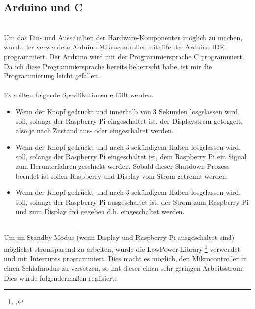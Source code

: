 \subsection{Arduino und C}\ \\
Um das Ein- und Ausschalten der Hardware-Komponenten möglich zu machen, wurde der verwendete Arduino Mikrocontroller mithilfe der Arduino IDE programmiert. Der Arduino wird mit der Programmiersprache C programmiert. Da ich diese Programmiersprache bereits beherrscht habe, ist mir die Programmierung leicht gefallen.\\
\\
Es sollten folgende Spezifikationen erfüllt werden:
\begin{itemize}
	\item Wenn der Knopf gedrückt und innerhalb von 3 Sekunden losgelassen wird, soll, solange der Raspberry Pi eingeschaltet ist, der Displaystrom getoggelt, also je nach Zustand aus- oder eingeschaltet werden.
	\item Wenn der Knopf gedrückt und nach 3-sekündigem Halten losgelassen wird, soll, solange der Raspberry Pi eingeschaltet ist, dem Raspberry Pi ein Signal zum Herunterfahren geschickt werden. Sobald dieser Shutdown-Prozess beendet ist sollen Raspberry und Display vom Strom getrennt werden.
	\item Wenn der Knopf gedrückt und nach 3-sekündigem Halten losgelassen wird, soll, solange der Raspberry Pi ausgeschaltet ist, der Strom zum Raspberry Pi und zum Display frei gegeben d.h. eingeschaltet werden.
\end{itemize}
\ \\
Um im Standby-Modus (wenn Display und Raspberry Pi ausgeschaltet sind) möglichst stromsparend zu arbeiten, wurde die LowPower-Library \footcite{lowpower_lib} verwendet und mit Interrupts programmiert. Dies macht es möglich, den Mikrocontroller in einen Schlafmodus zu versetzen, so hat dieser einen sehr geringen Arbeitsstrom.
\\
Dies wurde folgendermaßen realisiert:
